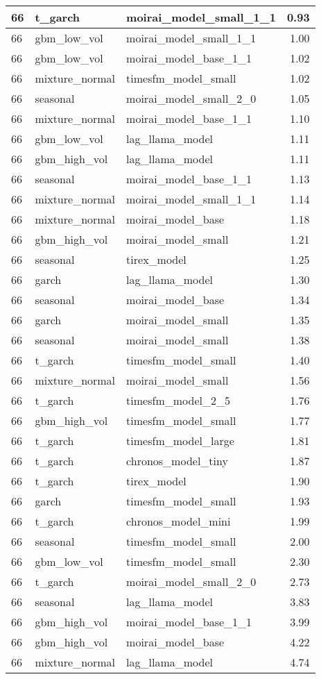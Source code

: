 {\begin{tabular}{lllr}
\midrule
66 & t\_garch & moirai\_model\_small\_1\_1 & 0.93 \\
\midrule
66 & gbm\_low\_vol & moirai\_model\_small\_1\_1 & 1.00 \\
\midrule
66 & gbm\_low\_vol & moirai\_model\_base\_1\_1 & 1.02 \\
\midrule
66 & mixture\_normal & timesfm\_model\_small & 1.02 \\
\midrule
66 & seasonal & moirai\_model\_small\_2\_0 & 1.05 \\
\midrule
66 & mixture\_normal & moirai\_model\_base\_1\_1 & 1.10 \\
\midrule
66 & gbm\_low\_vol & lag\_llama\_model & 1.11 \\
\midrule
66 & gbm\_high\_vol & lag\_llama\_model & 1.11 \\
\midrule
66 & seasonal & moirai\_model\_base\_1\_1 & 1.13 \\
\midrule
66 & mixture\_normal & moirai\_model\_small\_1\_1 & 1.14 \\
\midrule
66 & mixture\_normal & moirai\_model\_base & 1.18 \\
\midrule
66 & gbm\_high\_vol & moirai\_model\_small & 1.21 \\
\midrule
66 & seasonal & tirex\_model & 1.25 \\
\midrule
66 & garch & lag\_llama\_model & 1.30 \\
\midrule
66 & seasonal & moirai\_model\_base & 1.34 \\
\midrule
66 & garch & moirai\_model\_small & 1.35 \\
\midrule
66 & seasonal & moirai\_model\_small & 1.38 \\
\midrule
66 & t\_garch & timesfm\_model\_small & 1.40 \\
\midrule
66 & mixture\_normal & moirai\_model\_small & 1.56 \\
\midrule
66 & t\_garch & timesfm\_model\_2\_5 & 1.76 \\
\midrule
66 & gbm\_high\_vol & timesfm\_model\_small & 1.77 \\
\midrule
66 & t\_garch & timesfm\_model\_large & 1.81 \\
\midrule
66 & t\_garch & chronos\_model\_tiny & 1.87 \\
\midrule
66 & t\_garch & tirex\_model & 1.90 \\
\midrule
66 & garch & timesfm\_model\_small & 1.93 \\
\midrule
66 & t\_garch & chronos\_model\_mini & 1.99 \\
\midrule
66 & seasonal & timesfm\_model\_small & 2.00 \\
\midrule
66 & gbm\_low\_vol & timesfm\_model\_small & 2.30 \\
\midrule
66 & t\_garch & moirai\_model\_small\_2\_0 & 2.73 \\
\midrule
66 & seasonal & lag\_llama\_model & 3.83 \\
\midrule
66 & gbm\_high\_vol & moirai\_model\_base\_1\_1 & 3.99 \\
\midrule
66 & gbm\_high\_vol & moirai\_model\_base & 4.22 \\
\midrule
66 & mixture\_normal & lag\_llama\_model & 4.74 \\
\bottomrule
\end{tabular}
}